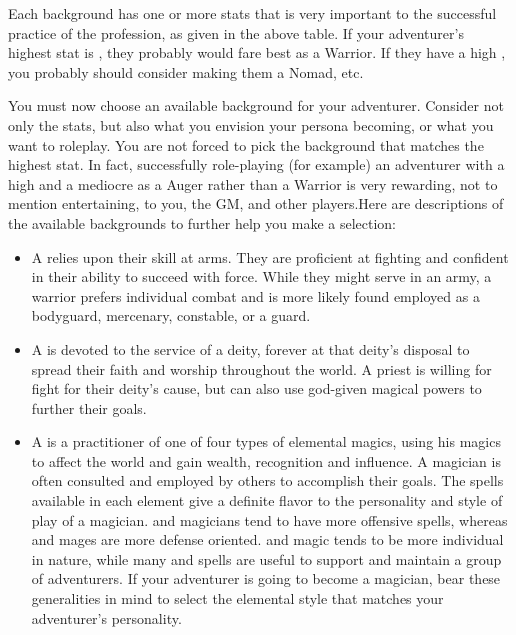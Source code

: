 \begin{multicols*}{2}
Each background has one or more stats that is very important to the successful practice of the profession, as given in the above table. If your adventurer's highest stat is
\STR, they probably would fare best as a Warrior. If they have a high \PER, you probably should consider making them a Nomad, etc.

You must now choose an available background for your adventurer. Consider not only the stats, but also what you envision your persona becoming, or what you want to roleplay. You are not forced to pick the background that matches the highest stat. In fact, successfully role-playing (for example) an adventurer with a high \STR and a mediocre \INT as a Auger rather than a Warrior is very rewarding, not to mention entertaining, to you, the GM, and other players.Here are descriptions of the available backgrounds to further help you make a selection:\begin{itemize}
\item {A  relies upon their skill at arms. They are proficient at fighting and confident in their ability to succeed with force. While they might serve in an army, a warrior prefers individual combat and is more likely found employed as a bodyguard, mercenary, constable, or a guard.}

\item A  is devoted to the service of a deity, forever at that deity's disposal to spread their faith and worship throughout the world. A priest is willing for fight for their deity's cause, but can also use god-given magical powers to further their goals.

\item A  is a practitioner of one of four types of elemental magics, using his magics to affect the world and gain wealth, recognition and influence. A magician is often consulted and employed by others to accomplish their goals.
The spells available in each element give a definite flavor to the personality and style of play of a magician.  and  magicians tend to have more offensive spells, whereas  and  mages are more defense oriented.  and  magic tends to be more individual in nature, while many  and  spells are useful to support and maintain a group of adventurers. If your adventurer is going to become a magician, bear these generalities in mind to select the elemental style that matches your adventurer's personality.


\end{itemize}
\end{multicols*}
